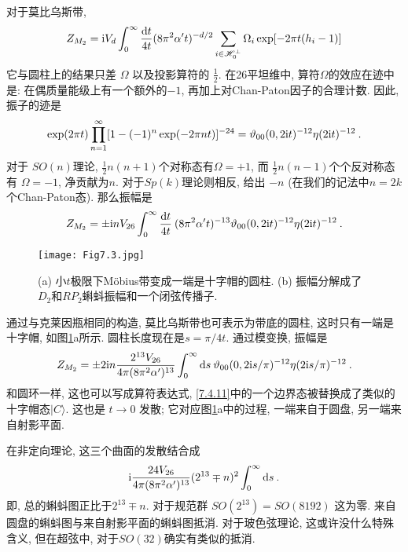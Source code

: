 对于莫比乌斯带,
\begin{equation}
	Z_{M_{2}}=\mathrm{i} V_{d} \int_{0}^{\infty} \frac{\mathrm{d} t}{4 t} (8 \pi^{2} \alpha^{\prime} t)^{-d / 2} 
	\sum_{i \in \mathscr{H}_{0}^{\perp}} \Omega_{i} \exp [-2 \pi t(h_{i}-1)] \label{7.4.20}
\end{equation}
它与圆柱上的结果只差 $\Omega$ 以及投影算符的 $\frac{1}{2}$. 在26平坦维中, 算符$\Omega$的效应在迹中是: 在偶质量能级上有一个额外的$-1$, 
再加上对Chan-Paton因子的合理计数. 因此, 振子的迹是
\begin{equation}
	\exp (2 \pi t) \prod_{n=1}^{\infty}[1-(-1)^{n} \exp (-2 \pi n t)]^{-24}=\vartheta_{00}(0,2 \mathrm{i} t)^{-12} \eta(2 \mathrm{i} t)^{-12} \:. \label{7.4.21}
\end{equation}
对于 $S O(n)$理论,  $\frac{1}{2} n(n+1)$个对称态有$\Omega=+1$, 而 $\frac{1}{2} n(n-1)$个个反对称态有 $\Omega=-1$, 净贡献为$n$. 
对于$S p(k)$理论则相反, 给出 $-n$ (在我们的记法中$n=2 k$个Chan-Paton态). 那么振幅是
\begin{equation}
	Z_{M_{2}}=\pm \mathrm{i} n V_{26} \int_{0}^{\infty} \frac{\mathrm{d} t}{4 t} \: (8 \pi^{2} \alpha^{\prime} t)^{-13} 
	\vartheta_{00}(0,2 \mathrm{i} t)^{-12} \eta(2 \mathrm{i} t)^{-12} \:. \label{7.4.22}
\end{equation}
 

\begin{figure}[h]
	\begin{center}
		\texttt{[image: Fig7.3.jpg]}\\
		\caption{(a) 小$t$极限下Möbius带变成一端是十字帽的圆柱. (b) 振幅分解成了$D_{2}$和$R P_{2}$蝌蚪振幅和一个闭弦传播子.}\label{Fig7.3}
	\end{center}
\end{figure}

通过与克莱因瓶相同的构造,  莫比乌斯带也可表示为带底的圆柱, 这时只有一端是十字帽, 如图\ref{Fig7.3}a所示. 
圆柱长度现在是$s=\pi / 4 t$. 通过模变换, 振幅是
\begin{equation}
Z_{M_{2}}=\pm 2 \mathrm{i} n \frac{2^{13} V_{26}}{4 \pi(8 \pi^{2} \alpha^{\prime})^{13}}
 \int_{0}^{\infty} \mathrm{d} s \: \vartheta_{00}(0,2 \mathrm{i} s / \pi)^{-12} \eta(2 \mathrm{i} s / \pi)^{-12} \:. \label{7.4.23}
\end{equation}
和圆环一样, 这也可以写成算符表达式, \eqref{7.4.11}中的一个边界态被替换成了类似的十字帽态$|C\rangle $. 
这也是 $t \rightarrow 0$ 发散; 它对应图\ref{Fig7.3}a中的过程, 一端来自于圆盘, 另一端来自射影平面. 

在非定向理论, 这三个曲面的发散结合成
\begin{equation}
	\mathrm{i} \frac{24 V_{26}}{4 \pi(8 \pi^{2} \alpha^{\prime})^{13}}(2^{13} \mp n)^{2} \int_{0}^{\infty} \mathrm{d} s\:. \label{7.4.24}
\end{equation}
即, 总的蝌蚪图正比于$2^{13} \mp n $. 对于规范群 $SO(2^{13})=S O(8192)$ 这为零. 来自圆盘的蝌蚪图与来自射影平面的蝌蚪图抵消. 
对于玻色弦理论, 这或许没什么特殊含义, 但在超弦中, 对于$SO(32)$确实有类似的抵消.